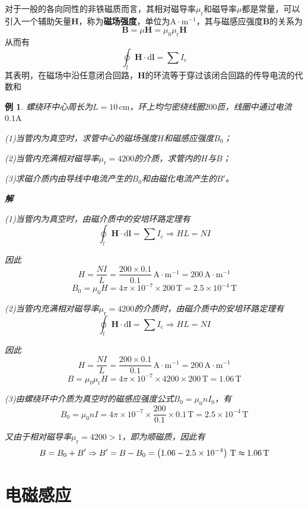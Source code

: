 \documentclass[12pt, a4paper, twoside]{ctexbook}
\newtheorem{example}[theorem]{例}
\begin{document}
对于一般的各向同性的非铁磁质而言，其相对磁导率$\mu_\mathrm{r}$和磁导率$\mu$都是常量，可以引入一个辅助矢量$\boldsymbol{H}$，称为\textbf{磁场强度}，单位为$\mathrm{A}\cdot\mathrm{m}^{-1}$，其与磁感应强度$\boldsymbol{B}$的关系为
$$
\boldsymbol{B}=\mu\boldsymbol{H}=\mu_0\mu_\mathrm{r}\boldsymbol{H}
$$
从而有
$$
\oint_l \boldsymbol{H}\cdot\mathrm{d}\boldsymbol{l}=\sum I_\mathrm{c}
$$
其表明，在磁场中沿任意闭合回路，$\boldsymbol{H}$的环流等于穿过该闭合回路的传导电流的代数和
\begin{example}
    螺绕环中心周长为$L=10\,\mathrm{cm}$，环上均匀密绕线圈$200$匝，线圈中通过电流$0.1\mathrm{A}$

    (1)当管内为真空时，求管中心的磁场强度$H$和磁感应强度$B_0$；

    (2)当管内充满相对磁导率$\mu_\mathrm{r}=4200$的介质，求管内的$H$与$B$；

    (3)求磁介质内由导线中电流产生的$B_0$和由磁化电流产生的$B'$。

    \noindent\textbf{解}

    (1)当管内为真空时，由磁介质中的安培环路定理有
    $$
    \oint_l \boldsymbol{H}\cdot\mathrm{d}\boldsymbol{l}=\sum I_\mathrm{c} \Rightarrow HL=NI
    $$

    因此
    $$
    H=\frac{NI}{L}=\frac{200\times0.1}{0.1}\,\mathrm{A}\cdot\mathrm{m}^{-1}=200\,\mathrm{A}\cdot\mathrm{m}^{-1}
    $$
    $$
    B_0=\mu_0 H=4\pi\times10^{-7}\times 200\,\mathrm{T}=2.5\times10^{-4}\,\mathrm{T}
    $$

    (2)当管内充满相对磁导率$\mu_\mathrm{r}=4200$的介质时，由磁介质中的安培环路定理有
    $$
    \oint_l \boldsymbol{H}\cdot\mathrm{d}\boldsymbol{l}=\sum I_\mathrm{c} \Rightarrow HL=NI
    $$

    因此
    $$
    H=\frac{NI}{L}=\frac{200\times0.1}{0.1}\,\mathrm{A}\cdot\mathrm{m}^{-1}=200\,\mathrm{A}\cdot\mathrm{m}^{-1}
    $$
    $$
    B=\mu_0\mu_\mathrm{r}H=4\pi\times10^{-7}\times4200\times200\,\mathrm{T}=1.06\,\mathrm{T}
    $$

    (3)由螺绕环中介质为真空时的磁感应强度公式$B_0=\mu_0nI_0$，有
    $$
    B_0=\mu_0nI=4\pi\times10^{-7}\times\frac{200}{0.1}\times0.1\,\mathrm{T}=2.5\times10^{-4}\,\mathrm{T}
    $$

    又由于相对磁导率$\mu_\mathrm{r}=4200>1$，即为顺磁质，因此有
    $$
    B=B_0+B' \Rightarrow B'=B-B_0=\left(1.06-2.5\times10^{-4}\right)\,\mathrm{T}\thickapprox1.06\,\mathrm{T}
    $$
\end{example}
\chapter{电磁感应}
\newpage
\end{document}
